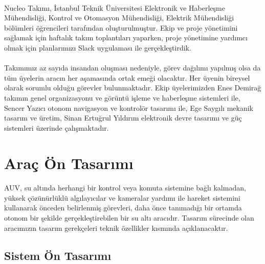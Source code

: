 \documentclass[12pt]{article}
\begin{document}
\begin{justify}
\paragraph{} Nucleo Takımı, İstanbul Teknik Üniversitesi Elektronik ve Haberleşme Mühendisliği, Kontrol ve Otomasyon Mühendisliği, Elektrik Mühendisliği bölümleri öğrencileri tarafından oluşturulmuştur. Ekip ve proje yönetimini sağlamak için haftalık takım toplantıları yaparken, proje yönetimine yardımcı olmak için planlarımızı Slack uygulaması ile gerçekleştirdik.
\end{justify}
\begin{justify}
\paragraph{} Takımımız az sayıda insandan oluşması nedeniyle, görev dağılımı yapılmış olsa da tüm üyelerin aracın her aşamasında ortak emeği olacaktır. Her üyenin bireysel olarak sorumlu olduğu görevler bulunmaktadır. Ekip üyelerimizden Enes Demirağ takımın genel organizasyonu ve görüntü işleme ve haberleşme sistemleri ile, Sencer Yazıcı otonom navigasyon ve kontrolör tasarımı ile, Ege Saygılı mekanik tasarım ve üretim, Sinan Ertuğrul Yıldırım elektronik devre tasarımı ve güç sistemleri üzerinde çalışmaktadır.
\end{justify}

\newpage

\section{Araç Ön Tasarımı}

\begin{justify}
\paragraph{} AUV, su altında herhangi bir kontrol veya komuta sistemine bağlı kalmadan, yüksek çözünürlüklü algılayıcılar ve kameralar yardımı ile hareket sistemini kullanarak önceden belirlenmiş görevleri, daha önce tanımadığı bir ortamda otonom bir şekilde gerçekleştirebilen bir su altı aracıdır. Tasarım sürecinde olan aracımızın tasarım gerekçeleri teknik özellikler kısmında açıklanacaktır.
\end{justify}

\subsection{Sistem Ön Tasarımı}
\end{document}
